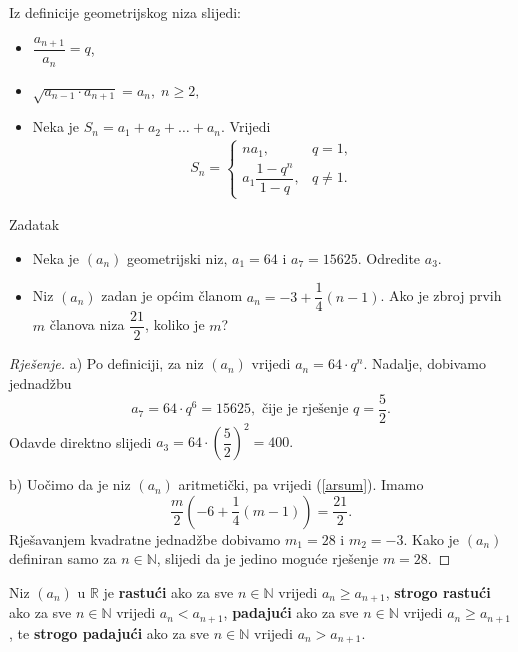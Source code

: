 \noindent Iz definicije geometrijskog niza slijedi:
\begin{itemize}
\item \(\dfrac{a_{n+1}}{a_n}=q\),
\item \(\sqrt{a_{n-1}\cdot a_{n+1}}=a_n, \; n\geq 2,\)
\item Neka je \(S_n=a_1+a_2+\dots+a_n\). Vrijedi
\begin{gather}
\label{geosum}
S_n=\begin{cases}
na_1, & q=1, \\
a_1\dfrac{1-q^n}{1-q}, & q\neq 1.
   \end{cases}
\end{gather}
\end{itemize}
\begin{exercise}{Zadatak}\textbf{}
\begin{itemize}
\item[a)] Neka je \((a_n)\) geometrijski niz, \(a_1=64\) i \(a_7=15625\). Odredite \(a_3\).
\item[b)] Niz \((a_n)\) zadan je općim članom \(a_n=-3+\dfrac{1}{4}(n-1)\). Ako je zbroj prvih \(m\) članova niza \(\dfrac{21}{2}\), koliko je \(m\)?
\end{itemize}
\end{exercise}
\begin{proof}[Rješenje]
a) Po definiciji, za niz \((a_n)\) vrijedi \(a_n=64\cdot q^n\). Nadalje, dobivamo jednadžbu
\[a_7=64\cdot q^6=15625,\text{ čije je rješenje } q=\dfrac{5}{2}.\]
Odavde direktno slijedi \(a_3=64\cdot \left(\dfrac{5}{2}\right)^2=400.\)

b) Uočimo da je niz \((a_n)\) aritmetički, pa vrijedi (\ref{arsum}). Imamo
\[\dfrac{m}{2}\left(-6+\dfrac{1}{4}(m-1)\right)=\dfrac{21}{2}.\]
Rješavanjem kvadratne jednadžbe dobivamo \(m_1=28\) i \(m_2=-3\). Kako je \((a_n)\) definiran samo za \(n\in \mathbb{N}\), slijedi da je jedino moguće rješenje \(m=28\).
\end{proof}
\begin{definition}
Niz \((a_n)\) u \(\mathbb{R}\) je \textbf{rastući} ako za sve \(n\in \mathbb{N}\) vrijedi \(a_n\geq a_{n+1}\), \textbf{strogo rastući} ako za sve \(n\in \mathbb{N}\) vrijedi \(a_n<a_{n+1}\), \textbf{padajući} ako za sve \(n\in \mathbb{N}\) vrijedi \(a_n\geq a_{n+1}\), te \textbf{strogo padajući} ako za sve \(n\in \mathbb{N}\) vrijedi \(a_n>a_{n+1}\).
\end{definition}

